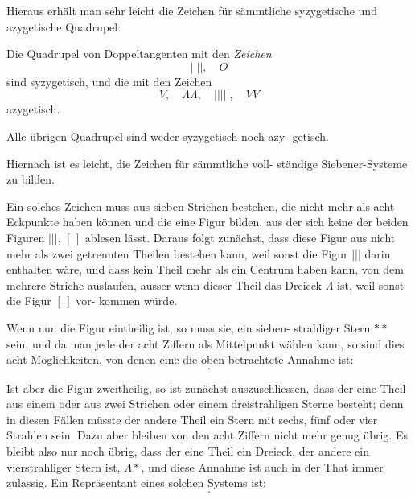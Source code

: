 \documentclass[12pt,a4paper]{article}
\theoremstyle{plain}
\theoremstyle{definition}
\theoremstyle{remark}
\begin{document}
Hieraus erhält man sehr leicht die Zeichen für sämmtliche
syzygetische und azygetische Quadrupel:

Die Quadrupel von Doppeltangenten mit den
\emph{Zeichen}
\begin{equation*}\label{eq:99_quad}
|\!|\!|\!|, \quad O
\end{equation*}
sind syzygetisch, und die mit den Zeichen
\begin{equation*}\label{eq:99_quad_a}
V, \quad \Lambda\Lambda, \quad |\!|\!|\!|\!|, \quad VV
\end{equation*}
azygetisch.

Alle übrigen Quadrupel sind weder syzygetisch noch azy-
getisch.

Hiernach ist es leicht, die Zeichen für sämmtliche voll-
ständige Siebener-Systeme zu bilden.

Ein solches Zeichen muss aus sieben Strichen bestehen, die
nicht mehr als acht Eckpunkte haben können und die eine Figur
bilden, aus der sich keine der beiden Figuren $|\!|\!|$, $[\,]$ ablesen
lässt. Daraus folgt zunächst, dass diese Figur aus nicht mehr als
zwei getrennten Theilen bestehen kann, weil sonst die Figur $|\!|\!|$
darin enthalten wäre, und dass kein Theil mehr als ein Centrum
haben kann, von dem mehrere Striche auslaufen, ausser wenn
dieser Theil das Dreieck $\Lambda$ ist, weil sonst die Figur $[\,]$ vor-
kommen würde.

Wenn nun die Figur eintheilig ist, so muss sie, ein sieben-
strahliger Stern $\ast\!\!\!\!\!\ast$ sein, und da man jede der acht Ziffern als
Mittelpunkt wählen kann, so sind dies acht Möglichkeiten, von
denen eine die oben betrachtete Annahme ist:
\begin{equation*}
[18][28][38][48][58][68][78].
\end{equation*}

Ist aber die Figur zweitheilig, so ist zunächst auszuschliessen,
dass der eine Theil aus einem oder aus zwei Strichen oder
einem dreistrahligen Sterne besteht; denn in diesen Fällen müsste
der andere Theil ein Stern mit sechs, fünf oder vier Strahlen
sein. Dazu aber bleiben von den acht Ziffern nicht mehr genug
übrig. Es bleibt also nur noch übrig, dass der eine Theil ein
Dreieck, der andere ein vierstrahliger Stern ist, $\Lambda \ast$, und diese
Annahme ist auch in der That immer zulässig. Ein Repräsentant
eines solchen Systems ist:
\begin{equation*}
[12][13][23][45][46][47][48].
\end{equation*}
\end{document}
